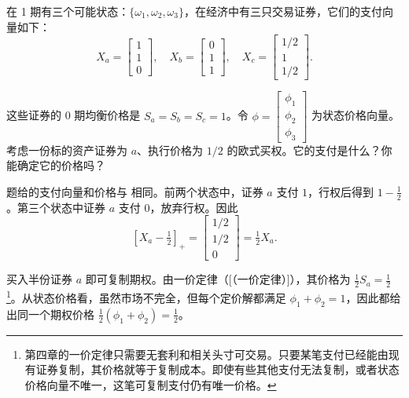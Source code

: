 \begin{problem}
\WJFiveProblem{} 在 1 期有三个可能状态：$\{\omega_{1},\omega_{2},\omega_{3}\}$，在经济中有三只交易证券，它们的支付向量如下：
\[
    X_{a}=\begin{bmatrix}1\\1\\0\end{bmatrix},\quad
    X_{b}=\begin{bmatrix}0\\1\\1\end{bmatrix},\quad
    X_{c}=\begin{bmatrix}1/2\\1\\1/2\end{bmatrix}.
\]

这些证券的 0 期均衡价格是 $S_{a}=S_{b}=S_{c}=1$。令 $\phi=\begin{bmatrix}\phi_{1} \\ \phi_{2} \\ \phi_{3}\end{bmatrix}$ 为状态价格向量。考虑一份标的资产证券为 $a$、执行价格为 $1/2$ 的欧式买权。它的支付是什么？你能确定它的价格吗？
\end{problem}
\begin{solution}[blank-type=manual,blank-vsep=9\baselineskip]

题给的支付向量和价格与 相同。前两个状态中，证券 $a$ 支付 $1$，行权后得到 $1-\tfrac12$。第三个状态中证券 $a$ 支付 $0$，放弃行权。因此
\[
 [X_a-\tfrac12]_+=\begin{bmatrix}1/2\\1/2\\0\end{bmatrix}=\tfrac12 X_a.
\]

 买入半份证券 $a$ 即可复制期权。由一价定律\ifdefined\WJHandoutKnowledge（[（一价定律）]）\fi，其价格为 $\tfrac12 S_a=\tfrac12$\footnote{第四章的一价定律只需要无套利和相关头寸可交易。只要某笔支付已经能由现有证券复制，其价格就等于复制成本。即使有些其他支付无法复制，或者状态价格向量不唯一，这笔可复制支付仍有唯一价格。}。从状态价格看，虽然市场不完全，但每个定价解都满足 $\phi_1+\phi_2=1$，因此都给出同一个期权价格 $\tfrac12(\phi_1+\phi_2)=\tfrac12$。
\end{solution}

